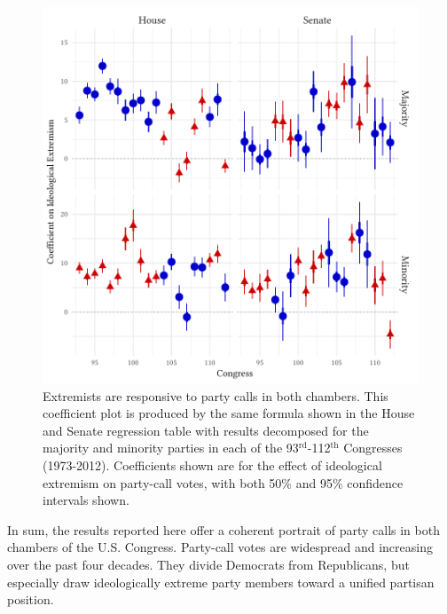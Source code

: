 \documentclass[12pt]{article}
\newcommand\fnote[1]{\captionsetup{font=normalsize}\caption*{#1}}
\begin{document}
\begin{figure}[!htbp]
\centering
\includegraphics{both-chambers-figure2.pdf}
\caption{Extremists are responsive to party calls in both chambers.
This coefficient plot is produced by the same formula shown in the House and Senate regression table with results decomposed for the majority and minority parties in each of the 93$^{\text{rd}}$-112$^{\text{th}}$ Congresses (1973-2012). Coefficients shown are for the effect of ideological extremism on party-call votes, with both 50\% and 95\% confidence intervals shown.
\label{fig-extremism-responsiveness}}

\end{figure}

In sum, the results reported here offer a coherent portrait of party calls in both chambers of the U.S. Congress. Party-call votes are widespread and increasing over the past four decades. They divide Democrats from Republicans, but especially draw ideologically extreme party members toward a unified partisan position.
\end{document}
